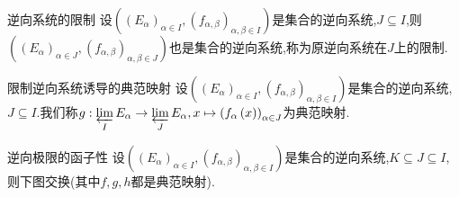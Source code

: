 \begin{definition}{逆向系统的限制}{}
	设$\left(\left(E_{\alpha}\right)_{\alpha\in I},\left(f_{\alpha,\beta}\right)_{\alpha,\beta\in I}\right)$是集合的逆向系统,$J\subseteq I$,则$\left(\left(E_{\alpha}\right)_{\alpha\in J},\left(f_{\alpha,\beta}\right)_{\alpha,\beta\in J}\right)$也是集合的逆向系统,称为原逆向系统在$J$上的限制.
\end{definition}

\begin{definition}{限制逆向系统诱导的典范映射}{}
	设$\left(\left(E_{\alpha}\right)_{\alpha\in I},\left(f_{\alpha,\beta}\right)_{\alpha,\beta\in I}\right)$是集合的逆向系统,$J\subseteq I$.我们称$g:\varprojlim \limits_{I}E_{\alpha}\to\varprojlim\limits_{J}E_{\alpha},x\mapsto\left(f_{\alpha}\left(x\right)\right)_{\alpha\in J}$为典范映射.
\end{definition}

\begin{proposition}{逆向极限的函子性}{}
	设$\left(\left(E_{\alpha}\right)_{\alpha\in I},\left(f_{\alpha,\beta}\right)_{\alpha,\beta\in I}\right)$是集合的逆向系统,$K\subseteq J\subseteq I$,则下图交换(其中$f,g,h$都是典范映射).
	\begin{center}
	\end{center}
\end{proposition}


















